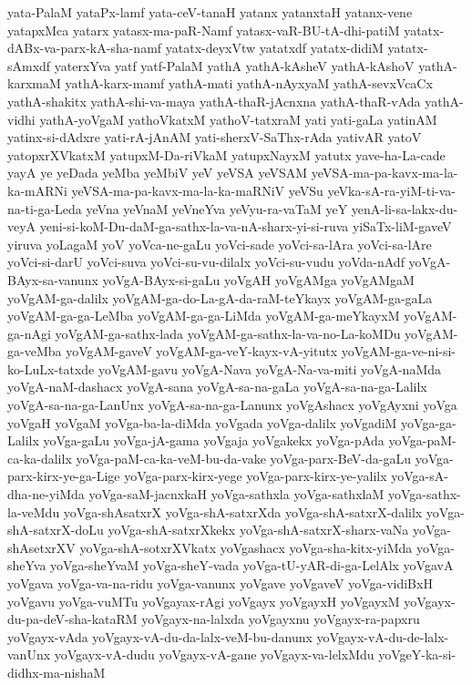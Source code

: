 {yata-PalaM
yataPx-lamf
yata-ceV-tanaH
yatanx
yatanxtaH
yatanx-vene
yatapxMca
yatarx
yatasx-ma-paR-Namf
yatasx-vaR-BU-tA-dhi-patiM
yatatx-dABx-va-parx-kA-sha-namf
yatatx-deyxVtw
yatatxdf
yatatx-didiM
yatatx-sAmxdf
yaterxYva
yatf
yatf-PalaM
yathA
yathA-kAsheV
yathA-kAshoV
yathA-karxmaM
yathA-karx-mamf
yathA-mati
yathA-nAyxyaM
yathA-sevxVcaCx
yathA-shakitx
yathA-shi-va-maya
yathA-thaR-jAcnxna
yathA-thaR-vAda
yathA-vidhi
yathA-yoVgaM
yathoVkatxM
yathoV-tatxraM
yati
yati-gaLa
yatinAM
yatinx-si-dAdxre
yati-rA-jAnAM
yati-sherxV-SaThx-rAda
yativAR
yatoV
yatopxrXVkatxM
yatupxM-Da-riVkaM
yatupxNayxM
yatutx
yave-ha-La-cade
yayA
ye
yeDada
yeMba
yeMbiV
yeV
yeVSA
yeVSAM
yeVSA-ma-pa-kavx-ma-la-ka-mARNi
yeVSA-ma-pa-kavx-ma-la-ka-maRNiV
yeVSu
yeVka-sA-ra-yiM-ti-va-na-ti-ga-Leda
yeVna
yeVnaM
yeVneYva
yeVyu-ra-vaTaM
yeY
yenA-li-sa-lakx-du-veyA
yeni-si-koM-Du-daM-ga-sathx-la-va-nA-sharx-yi-si-ruva
yiSaTx-liM-gaveV
yiruva
yoLagaM
yoV
yoVca-ne-gaLu
yoVci-sade
yoVci-sa-lAra
yoVci-sa-lAre
yoVci-si-darU
yoVci-suva
yoVci-su-vu-dilalx
yoVci-su-vudu
yoVda-nAdf
yoVgA-BAyx-sa-vanunx
yoVgA-BAyx-si-gaLu
yoVgAH
yoVgAMga
yoVgAMgaM
yoVgAM-ga-dalilx
yoVgAM-ga-do-La-gA-da-raM-teYkayx
yoVgAM-ga-gaLa
yoVgAM-ga-ga-LeMba
yoVgAM-ga-ga-LiMda
yoVgAM-ga-meYkayxM
yoVgAM-ga-nAgi
yoVgAM-ga-sathx-lada
yoVgAM-ga-sathx-la-va-no-La-koMDu
yoVgAM-ga-veMba
yoVgAM-gaveV
yoVgAM-ga-veY-kayx-vA-yitutx
yoVgAM-ga-ve-ni-si-ko-LuLx-tatxde
yoVgAM-gavu
yoVgA-Nava
yoVgA-Na-va-miti
yoVgA-naMda
yoVgA-naM-dashacx
yoVgA-sana
yoVgA-sa-na-gaLa
yoVgA-sa-na-ga-Lalilx
yoVgA-sa-na-ga-LanUnx
yoVgA-sa-na-ga-Lanunx
yoVgAshacx
yoVgAyxni
yoVga
yoVgaH
yoVgaM
yoVga-ba-la-diMda
yoVgada
yoVga-dalilx
yoVgadiM
yoVga-ga-Lalilx
yoVga-gaLu
yoVga-jA-gama
yoVgaja
yoVgakekx
yoVga-pAda
yoVga-paM-ca-ka-dalilx
yoVga-paM-ca-ka-veM-bu-da-vake
yoVga-parx-BeV-da-gaLu
yoVga-parx-kirx-ye-ga-Lige
yoVga-parx-kirx-yege
yoVga-parx-kirx-ye-yalilx
yoVga-sA-dha-ne-yiMda
yoVga-saM-jacnxkaH
yoVga-sathxla
yoVga-sathxlaM
yoVga-sathx-la-veMdu
yoVga-shAsatxrX
yoVga-shA-satxrXda
yoVga-shA-satxrX-dalilx
yoVga-shA-satxrX-doLu
yoVga-shA-satxrXkekx
yoVga-shA-satxrX-sharx-vaNa
yoVga-shAsetxrXV
yoVga-shA-sotxrXVkatx
yoVgashacx
yoVga-sha-kitx-yiMda
yoVga-sheYva
yoVga-sheYvaM
yoVga-sheY-vada
yoVga-tU-yAR-di-ga-LelAlx
yoVgavA
yoVgava
yoVga-va-na-ridu
yoVga-vanunx
yoVgave
yoVgaveV
yoVga-vidiBxH
yoVgavu
yoVga-vuMTu
yoVgayax-rAgi
yoVgayx
yoVgayxH
yoVgayxM
yoVgayx-du-pa-deV-sha-kataRM
yoVgayx-na-lalxda
yoVgayxnu
yoVgayx-ra-papxru
yoVgayx-vAda
yoVgayx-vA-du-da-lalx-veM-bu-danunx
yoVgayx-vA-du-de-lalx-vanUnx
yoVgayx-vA-dudu
yoVgayx-vA-gane
yoVgayx-va-lelxMdu
yoVgeY-ka-si-didhx-ma-nishaM
}

